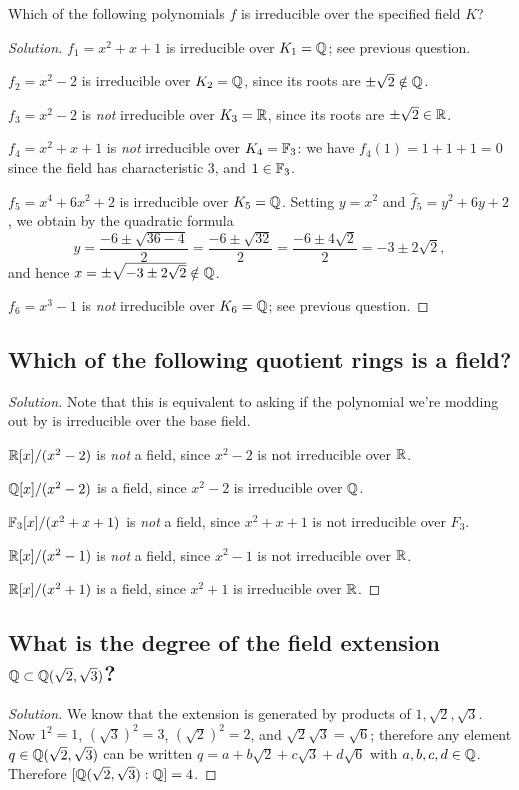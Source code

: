 Which of the following polynomials $f$ is irreducible over the specified field $K$?
\begin{proof}[Solution]
$f_1 = x^2 + x + 1$ is irreducible over $K_1 = \mathbb{Q}$; see previous question.

$f_2 = x^2 - 2$ is irreducible over $K_2 = \mathbb{Q}$, since its roots are $\pm \sqrt{2} \notin \mathbb{Q}$.

$f_3 = x^2 - 2$ is \emph{not} irreducible over $K_3 = \mathbb{R}$, since its roots are $\pm \sqrt{2} \in \mathbb{R}$.

$f_4 = x^2 + x + 1$ is \emph{not} irreducible over $K_4 = \mathbb{F}_3$: we have $f_4(1) = 1 + 1 + 1 = 0$ since the field has characteristic $3$, and $1 \in \mathbb{F}_3$.

$f_5 = x^4 + 6x^2 + 2$ is irreducible over $K_5 = \mathbb{Q}$. Setting $y = x^2$ and $\hat{f}_5 = y^2 + 6y + 2$, we obtain by the quadratic formula \[y = \frac{-6 \pm \sqrt{36 - 4}}{2} = \frac{-6 \pm \sqrt{32}}{2} = \frac{-6 \pm 4\sqrt{2}}{2} = -3 \pm 2 \sqrt{2},\] and hence $x = \pm \sqrt{-3 \pm 2 \sqrt{2}} \notin \mathbb{Q}$.

$f_6 = x^3 - 1$ is \emph{not} irreducible over $K_6 = \mathbb{Q}$; see previous question.
\end{proof}

\subsection*{Which of the following quotient rings is a field?}
\begin{proof}[Solution]
Note that this is equivalent to asking if the polynomial we're modding out by is irreducible over the base field.

$\mathbb{R}[x]/(x^2 - 2)$ is \emph{not} a field, since $x^2 - 2$ is not irreducible over $\mathbb{R}$.

$\mathbb{Q}[x]/(x^2 - 2)$ is a field, since $x^2 - 2$ is irreducible over $\mathbb{Q}$.

$\mathbb{F}_3[x]/(x^2 + x + 1)$ is \emph{not} a field, since $x^2 + x + 1$ is not irreducible over $F_3$.

$\mathbb{R}[x]/(x^2 - 1)$ is \emph{not} a field, since $x^2 - 1$ is not irreducible over $\mathbb{R}$.

$\mathbb{R}[x]/(x^2 + 1)$ is a field, since $x^2 + 1$ is irreducible over $\mathbb{R}$.
\end{proof}

\subsection*{What is the degree of the field extension $\mathbb{Q} \subset \mathbb{Q}(\sqrt{2}, \sqrt{3})$?}
\begin{proof}[Solution]
We know that the extension is generated by products of $1, \sqrt{2}, \sqrt{3}$. Now $1^2 = 1$, $(\sqrt{3})^2 = 3$, $(\sqrt{2})^2 = 2$, and $\sqrt{2}\sqrt{3} = \sqrt{6}$; therefore any element $q \in \mathbb{Q}(\sqrt{2}, \sqrt{3})$ can be written $q = a + b\sqrt{2} + c\sqrt{3} + d\sqrt{6}$ with $a, b, c, d \in \mathbb{Q}$. Therefore $[\mathbb{Q}(\sqrt{2}, \sqrt{3}) : \mathbb{Q}] = 4$.
\end{proof}